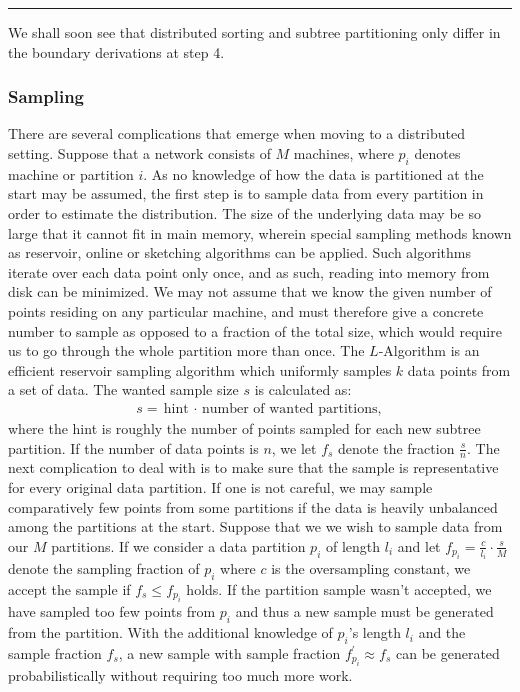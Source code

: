 \documentclass{report}
\begin{document}
\noindent\rule{\textwidth}{1.0pt}
We shall soon see that distributed sorting and subtree partitioning only differ in the boundary derivations at step 4.

\subsubsection{Sampling}

	There are several complications that emerge when moving to a distributed setting. Suppose that a network consists of $M$ machines, where $p_i$ denotes machine or partition $i$. 
	As no knowledge of how the data is partitioned at the start may be assumed, the first step is to sample data from every partition in order to estimate the distribution. The size of the underlying data
	may be so large that it cannot fit in main memory, wherein special sampling methods known as reservoir, online or sketching algorithms can be applied. Such algorithms iterate over each data point only once,
	and as such, reading into memory from disk can be minimized. We may not assume that we know the given number of points residing on any particular machine, and must therefore give a concrete number to sample as opposed to  
	a fraction of the total size, which would require us to go through the whole partition more than once. The $L$-Algorithm \cite{L-algorithm} is an efficient reservoir sampling algorithm which uniformly
	samples $k$ data points from a set of data. The wanted sample size $s$ is calculated as: 
	\begin{align*}
		s = \text{hint $\cdot$ number of wanted partitions,}
	\end{align*}
	where the hint is roughly the number of points sampled for each new subtree partition. If the number of data points is $n$, we let $f_s$ denote the fraction $\frac{s}{n}$. The next complication to deal with 
	is to make sure that the sample is representative for every original data partition. If one is not careful, we may sample comparatively few points from some partitions if the data is heavily unbalanced among the
	partitions at the start. Suppose that we we wish to sample data from our $M$ partitions. If we consider a data partition $p_i$ of length $l_i$ and let $f_{p_i} = \frac{c}{l_i}\cdot \frac{s}{M}$ 
	denote the sampling fraction of $p_i$ where $c$ is the oversampling constant, we accept the sample if $f_s \leq f_{p_i}$ holds. If the partition sample wasn't accepted, we have sampled too few points from $p_i$ 
	and thus a new sample must be generated from the partition. With the additional knowledge of $p_i$'s length $l_i$ and the sample fraction $f_s$, a new sample with sample fraction $f_{p_i}^\prime \approx f_s$ can be generated
	probabilistically without requiring too much more work.
\end{document}
